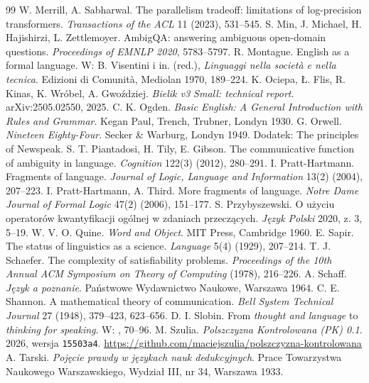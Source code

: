 \documentclass[11pt,a4paper]{article}
\begin{document}
\begin{thebibliography}{99}
 W. Merrill, A. Sabharwal. The parallelism tradeoff: limitations of log-precision transformers. \emph{Transactions of the ACL} 11 (2023), 531--545.
 S. Min, J. Michael, H. Hajishirzi, L. Zettlemoyer. AmbigQA: answering ambiguous open-domain questions. \emph{Proceedings of EMNLP 2020}, 5783--5797.
 R. Montague. English as a formal language. W: B. Visentini i in. (red.), \emph{Linguaggi nella società e nella tecnica}. Edizioni di Comunità, Mediolan 1970, 189--224.
 K. Ociepa, Ł. Flis, R. Kinas, K. Wróbel, A. Gwoździej. \emph{Bielik v3 Small: technical report}. arXiv:2505.02550, 2025.
 C. K. Ogden. \emph{Basic English: A General Introduction with Rules and Grammar}. Kegan Paul, Trench, Trubner, Londyn 1930.
 G. Orwell. \emph{Nineteen Eighty-Four}. Secker \& Warburg, Londyn 1949. Dodatek: The principles of Newspeak.
 S. T. Piantadosi, H. Tily, E. Gibson. The communicative function of ambiguity in language. \emph{Cognition} 122(3) (2012), 280--291.
 I. Pratt-Hartmann. Fragments of language. \emph{Journal of Logic, Language and Information} 13(2) (2004), 207--223.
 I. Pratt-Hartmann, A. Third. More fragments of language. \emph{Notre Dame Journal of Formal Logic} 47(2) (2006), 151--177.
 S. Przybyszewski. O użyciu operatorów kwantyfikacji ogólnej w zdaniach przeczących. \emph{Język Polski} 2020, z. 3, 5--19.
 W. V. O. Quine. \emph{Word and Object}. MIT Press, Cambridge 1960.
 E. Sapir. The status of linguistics as a science. \emph{Language} 5(4) (1929), 207--214.
 T. J. Schaefer. The complexity of satisfiability problems. \emph{Proceedings of the 10th Annual ACM Symposium on Theory of Computing} (1978), 216--226.
 A. Schaff. \emph{Język a poznanie}. Państwowe Wydawnictwo Naukowe, Warszawa 1964.
 C. E. Shannon. A mathematical theory of communication. \emph{Bell System Technical Journal} 27 (1948), 379--423, 623--656.
 D. I. Slobin. From \emph{thought and language} to \emph{thinking for speaking}. W: \cite{gumperz1996}, 70--96.
 M. Szulia. \emph{Polszczyzna Kontrolowana (PK) 0.1}. 2026, wersja \texttt{15503a4}. \url{https://github.com/maciejszulia/polszczyzna-kontrolowana}
 A. Tarski. \emph{Pojęcie prawdy w językach nauk dedukcyjnych}. Prace Towarzystwa Naukowego Warszawskiego, Wydział III, nr 34, Warszawa 1933.

\end{thebibliography}
\end{document}
